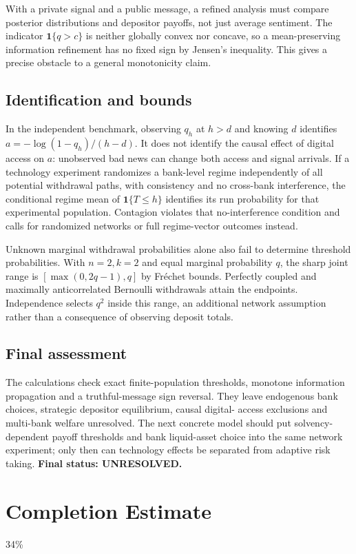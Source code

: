 \documentclass[11pt]{article}
\begin{document}
With a private signal and a public message, a refined analysis must compare
posterior distributions and depositor payoffs, not just average sentiment.
The indicator $\mathbf1\{q>c\}$ is neither globally convex nor concave,
so a mean-preserving information refinement has no fixed sign by Jensen's
inequality. This gives a precise obstacle to a general monotonicity claim.

\subsection*{Identification and bounds}
In the independent benchmark, observing $q_h$ at $h>d$ and knowing $d$
identifies $a=-\log(1-q_h)/(h-d)$. It does not identify the causal effect
of digital access on $a$: unobserved bad news can change both access and
signal arrivals. If a technology experiment randomizes a bank-level regime
independently of all potential withdrawal paths, with consistency and no
cross-bank interference, the conditional regime mean of
$\mathbf1\{T\leq h\}$ identifies its run probability for that experimental
population. Contagion violates that no-interference condition and calls for
randomized networks or full regime-vector outcomes instead.

Unknown marginal withdrawal probabilities alone also fail to determine
threshold probabilities. With $n=2,k=2$ and equal marginal probability
$q$, the sharp joint range is $[\max(0,2q-1),q]$ by Fr\'echet bounds.
Perfectly coupled and maximally anticorrelated Bernoulli withdrawals attain
the endpoints. Independence selects $q^2$ inside this range, an additional
network assumption rather than a consequence of observing deposit totals.

\subsection*{Final assessment}
The calculations check exact finite-population thresholds, monotone
information propagation and a truthful-message sign reversal. They leave
endogenous bank choices, strategic depositor equilibrium, causal digital-
access exclusions and multi-bank welfare unresolved. The next concrete
model should put solvency-dependent payoff thresholds and bank liquid-asset
choice into the same network experiment; only then can technology effects
be separated from adaptive risk taking. \textbf{Final status: UNRESOLVED.}

\section{Completion Estimate}
34\%
\end{document}
